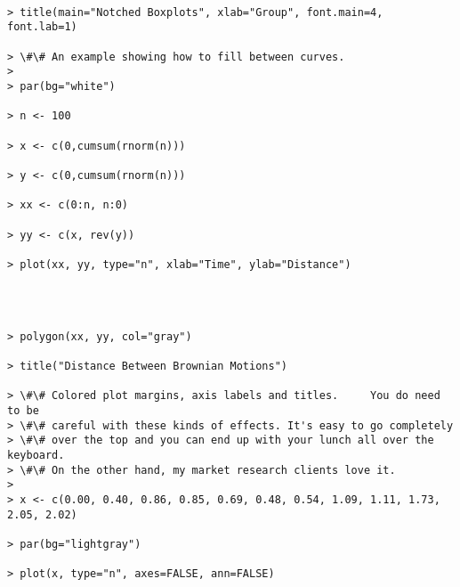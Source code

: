 \documentclass[11pt]{article}
\begin{document}
    \begin{Verbatim}[commandchars=\\\{\}]

> title(main="Notched Boxplots", xlab="Group", font.main=4, font.lab=1)

> \#\# An example showing how to fill between curves.
> 
> par(bg="white")

> n <- 100

> x <- c(0,cumsum(rnorm(n)))

> y <- c(0,cumsum(rnorm(n)))

> xx <- c(0:n, n:0)

> yy <- c(x, rev(y))

> plot(xx, yy, type="n", xlab="Time", ylab="Distance")

    \end{Verbatim}

    \begin{center}
    \end{center}
    { \hspace*{\fill} \\}
    
    \begin{Verbatim}[commandchars=\\\{\}]

> polygon(xx, yy, col="gray")

> title("Distance Between Brownian Motions")

> \#\# Colored plot margins, axis labels and titles.	 You do need to be
> \#\# careful with these kinds of effects.	It's easy to go completely
> \#\# over the top and you can end up with your lunch all over the keyboard.
> \#\# On the other hand, my market research clients love it.
> 
> x <- c(0.00, 0.40, 0.86, 0.85, 0.69, 0.48, 0.54, 1.09, 1.11, 1.73, 2.05, 2.02)

> par(bg="lightgray")

> plot(x, type="n", axes=FALSE, ann=FALSE)

    \end{Verbatim}

    \begin{center}
    \end{center}
    { \hspace*{\fill} \\}
    
\end{document}

